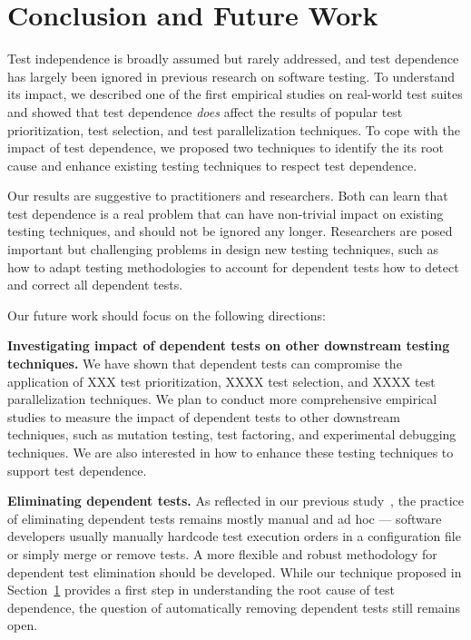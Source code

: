 \section{Conclusion and Future Work}

Test independence is broadly assumed but rarely addressed, and
test dependence has largely been ignored in previous research
on software testing. To understand its impact, we described
one of the first empirical studies on real-world test suites and
showed that test dependence \textit{does} affect the results
of popular test prioritization, test selection, and test
parallelization techniques. To cope with the impact of test
dependence, we proposed two techniques to identify
the its root cause and enhance existing testing
techniques to respect test dependence.


Our results are suggestive to practitioners and researchers.
Both can learn that test dependence is a real problem that
can have non-trivial impact on existing testing techniques, and
should not be ignored any longer. Researchers are posed important
but challenging problems in design new testing techniques,
such as how to adapt testing methodologies to account for
dependent tests how to detect and correct all dependent tests.

Our future work should focus on the following directions:

\vspace{1mm}

\noindent \textbf{{Investigating impact of dependent tests
on other downstream testing techniques.}}
We have shown that dependent tests can compromise the application of
XXX test prioritization, XXXX test selection,
and XXXX test parallelization techniques.
We plan to conduct more comprehensive empirical studies to
measure the impact of dependent tests to other
downstream techniques, such as mutation testing,
test factoring, and experimental
debugging techniques.
We are also interested in how to enhance these
testing techniques to support test dependence.



\vspace{1mm}

\noindent \textbf{{Eliminating dependent tests.}}
As reflected in our previous study~\cite{},
the practice of eliminating dependent tests
remains mostly manual and ad hoc --- software developers
usually manually hardcode test
execution orders in a configuration file or
simply merge or remove tests.
A more flexible and robust methodology for
dependent test elimination should be developed.
While our technique proposed in Section~\ref{}
provides a first step in understanding the root cause
of test dependence, the question
of automatically removing dependent tests
still remains open.

